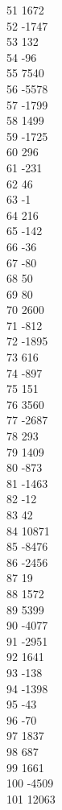 { 51	1672 \\
 52	-1747 \\
 53	132 \\
 54	-96 \\
 55	7540 \\
 56	-5578 \\
 57	-1799 \\
 58	1499 \\
 59	-1725 \\
 60	296 \\
 61	-231 \\
 62	46 \\
 63	-1 \\
 64	216 \\
 65	-142 \\
 66	-36 \\
 67	-80 \\
 68	50 \\
 69	80 \\
 70	2600 \\
 71	-812 \\
 72	-1895 \\
 73	616 \\
 74	-897 \\
 75	151 \\
 76	3560 \\
 77	-2687 \\
 78	293 \\
 79	1409 \\
 80	-873 \\
 81	-1463 \\
 82	-12 \\
 83	42 \\
 84	10871 \\
 85	-8476 \\
 86	-2456 \\
 87	19 \\
 88	1572 \\
 89	5399 \\
 90	-4077 \\
 91	-2951 \\
 92	1641 \\
 93	-138 \\
 94	-1398 \\
 95	-43 \\
 96	-70 \\
 97	1837 \\
 98	687 \\
 99	1661 \\
 100	-4509 \\
 101	12063 \\
}
